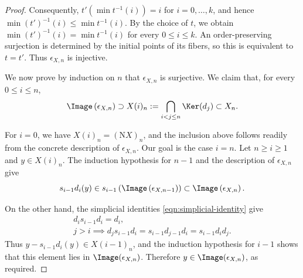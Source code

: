 \begin{proof}
	Consequently, $t'(\min t^{-1}(i))=i$ for $i=0,\ldots,k$, and hence
	$\min(t')^{-1}(i)\leq\min t^{-1}(i)$. By the choice of $t$, we obtain
	$\min(t')^{-1}(i)=\min t^{-1}(i)$ for every $0\leq i\leq k$.
	An order-preserving surjection is determined by the initial points of its
	fibers, so this is equivalent to $t=t'$. Thus $\epsilon_{X,n}$ is
	injective.

	We now prove by induction on $n$ that $\epsilon_{X,n}$ is surjective. We
	claim that, for every $0\leq i\leq n$,
	\[ \Image\left( \epsilon_{X, n} \right) \supset X(i)_n := \bigcap_{i < j \leq n} \Ker(d_j) \subset X_n. \]

	For $i=0$, we have $X(i)_n=(\mathrm{N}X)_n$, and the inclusion above
	follows readily from the concrete description of $\epsilon_{X,n}$. Our
	goal is the case $i=n$. Let $n\geq i\geq1$ and $y\in X(i)_n$. The
	induction hypothesis for $n-1$ and the description of $\epsilon_{X,n}$
	give
	\[ s_{i-1} d_i(y) \in s_{i-1}\left( \Image\left(\epsilon_{X, n-1}\right) \right) \subset \Image\left( \epsilon_{X, n} \right). \]

	On the other hand, the simplicial identities
	\eqref{eqn:simplicial-identity} give
	\begin{gather*}
		d_i s_{i-1} d_i = d_i, \\
		j > i \implies d_j s_{i-1} d_i = s_{i-1} d_{j-1} d_i = s_{i-1} d_i d_j.
	\end{gather*}
	Thus $y-s_{i-1}d_i(y)\in X(i-1)_n$, and the induction hypothesis for
	$i-1$ shows that this element lies in
	$\Image(\epsilon_{X,n})$. Therefore
	$y\in\Image(\epsilon_{X,n})$, as required.
\end{proof}
